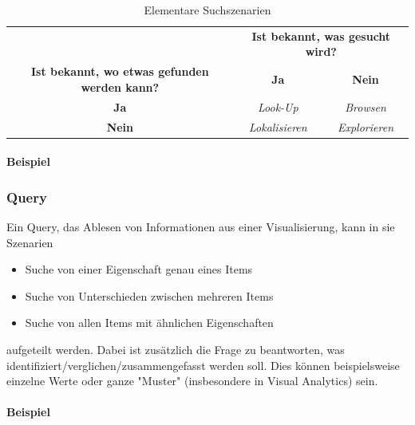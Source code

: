 				\begin{table}
					\centering
					\begin{tabular}{c|cc}
						\toprule
						                                                     & \multicolumn{2}{c}{\textbf{Ist bekannt, was gesucht wird?}} \\
						\textbf{Ist bekannt, wo etwas gefunden werden kann?} &     \textbf{Ja}     &             \textbf{Nein}             \\ \midrule
						                    \textbf{Ja}                      &   \emph{Look-Up}    &            \emph{Browsen}             \\
						                   \textbf{Nein}                     & \emph{Lokalisieren} &          \emph{Explorieren}           \\ \bottomrule
					\end{tabular}
					\caption{Elementare Suchszenarien}
					\label{tab:suche}
				\end{table}

				\paragraph{Beispiel}

			\subsubsection{Query}
				Ein Query, \dh das Ablesen von Informationen aus einer Visualisierung, kann in sie Szenarien
				\begin{itemize}
					\item {} Suche von einer Eigenschaft genau eines Items
					\item {}    Suche von Unterschieden zwischen mehreren Items
					\item {} Suche von allen Items mit ähnlichen Eigenschaften
				\end{itemize}
				aufgeteilt werden. Dabei ist zusätzlich die Frage zu beantworten, was identifiziert/verglichen/zusammengefasst werden soll. Dies können beispielsweise einzelne Werte oder ganze "Muster" (insbesondere in Visual Analytics) sein.

				\paragraph{Beispiel}

